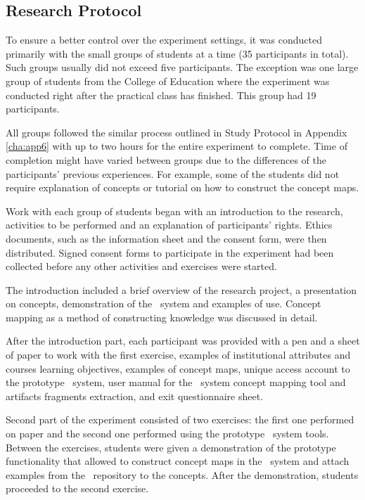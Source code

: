 \subsection{Research Protocol}

To ensure a better control over the experiment settings, it was conducted
primarily with the small groups of students at a time (35 participants in
total). Such groups usually did not exceed five participants. The exception was
one large group of students from the College of Education where the experiment
was conducted right after the practical class has finished. This group had 19
participants. 

All groups followed the similar process outlined in Study Protocol
in Appendix \ref{cha:app6} with up to two hours for the entire experiment to
complete. Time of completion might have varied between groups due to the
differences of the participants' previous experiences. For example, some of the
students did not require explanation of \LLLs concepts or tutorial on how to
construct the concept maps.

Work with each group of students began with an introduction to the research,
activities to be performed and an explanation of participants' rights.
Ethics documents, such as the information sheet and the consent form, were then
distributed. Signed consent forms to participate in the experiment had been
collected before any other activities and exercises were started.

The introduction included a brief overview of the research project, a
presentation on \LLLs concepts, demonstration of the \ep~system and examples of
use. Concept mapping as a method of constructing knowledge was discussed in
detail.

After the introduction part, each participant was provided with a pen and a
sheet of paper to work with the first exercise, examples of institutional
attributes and courses learning objectives, examples of concept maps, unique
access account to the prototype \ep~system, user manual for the \ep~system
concept mapping tool and artifacts fragments extraction, and exit questionnaire
sheet.

Second part of the experiment consisted of two exercises: the first one
performed on paper and the second one performed using the prototype \ep~system
tools. Between the exercises, students were given a demonstration of the
prototype functionality that allowed to construct concept maps in the \ep~system
and attach examples from the \ep~repository to the concepts. After the
demonstration, students proceeded to the second exercise. 

